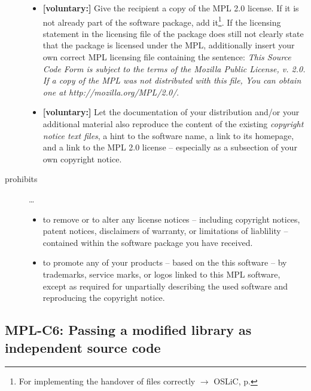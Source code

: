 \begin{description}
\begin{itemize}
  \item \textbf{[voluntary:]} Give the recipient a copy of the MPL 2.0 license.
  If it is not already part of the software package, add it\footnote{For
  implementing the handover of files correctly $\rightarrow$ OSLiC, p.
  \pageref{DistributingFilesHint}}. If the licensing statement in the licensing
  file of the package does still not clearly state that the package is licensed
  under the MPL, additionally insert your own correct MPL licensing file
  containing the sentence: \emph{This Source Code Form is subject to the terms
  of the Mozilla Public License, v. 2.0. If a copy of the MPL was not
  distributed with this file, You can obtain one at
  http://mozilla.org/MPL/2.0/}.
 
  \item \textbf{[voluntary:]} Let the documentation of your distribution and/or
  your additional material  also reproduce the content of the existing
  \emph{copyright notice text files}, a hint to the software name, a link to its
  homepage, and a link to the MPL 2.0 license -- especially as a subsection of
  your own copyright notice.

\end{itemize}  

\item[prohibits] \ldots
\begin{itemize}
  \item to remove or to alter any license notices -- including copyright
  notices, patent notices, disclaimers of warranty, or limitations of liablility
  -- contained within the software package you have received.
  \item to promote any of your products -- based on the this software -- by
  trademarks, service marks, or logos linked to this MPL software, except as
  required for unpartially describing the used software and reproducing the
  copyright notice.
\end{itemize}

\end{description}

\subsection{MPL-C6: Passing a modified library as independent source code}
\label{OSUC-08S-MPL}

